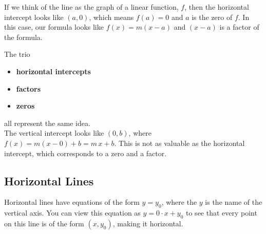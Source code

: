 \documentclass{ximera}
\begin{document}
If we think of the line as the graph of a linear function, $f$, then the horizontal intercept looks like $(a, 0)$, which means $f(a)=0$ and $a$ is the zero of $f$. In this case, our formula looks like $f(x) = m (x-a)$ and $(x - a)$ is a factor of the formula.



The trio 

\begin{itemize}
\item \textbf{\textcolor{blue!55!black}{horizontal intercepts}} 
\item \textbf{\textcolor{blue!55!black}{factors}} 
\item \textbf{\textcolor{blue!55!black}{zeros}} 
\end{itemize}

all represent the same idea. \\



The vertical intercept looks like $(0, b)$, where $f(x) = m(x-0)+b = m \, x + b$.  This is not as valuable as the horizontal intercept, which corresponds to a zero and a factor. \\










\subsection*{Horizontal Lines} 

Horizontal lines have equations of the form $y = y_0$, where the $y$ is the name of the vertical axis. You can view this equation as $y = 0 \cdot x + y_0$ to see that every point on this line is of the form $(x, y_0)$, making it horizontal.
\end{document}
